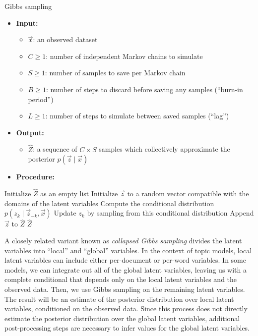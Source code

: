 \documentclass{article}
\begin{document}
\begin{algorithm}
\caption{Gibbs sampling}
\label{alg:gibbs}
\begin{itemize}[leftmargin=*]
\item \textbf{Input:}
  \begin{itemize}
  \item $\vec x$: an observed dataset
  \item $C \geq 1$: number of independent Markov chains to simulate
  \item $S \geq 1$: number of samples to save per Markov chain
  \item $B \geq 1$: number of steps to discard before saving any samples (``burn-in period'')
  \item $L \geq 1$: number of steps to simulate between saved samples (``lag'')
  \end{itemize}
\item \textbf{Output:}
  \begin{itemize}
  \item $\hat Z$: a sequence of $C \times S$ samples which collectively approximate the posterior $p(\vec z \mid \vec x)$
  \end{itemize}
\item \textbf{Procedure:}
\end{itemize}
\begin{algorithmic}
\State Initialize $\hat Z$ as an empty list
  \State Initialize $\vec z$ to a random vector compatible with the domains of the latent variables
    \State Compute the conditional distribution $p(z_k \mid \vec z_{-k}, \vec x)$
    \State Update $z_k$ by sampling from this conditional distribution
      \State Append $\vec z$ to $\hat Z$
    \EndIf
  \EndFor
\EndFor
\State \Return $\hat Z$
\end{algorithmic}
\end{algorithm}

A closely related variant known as \emph{collapsed Gibbs sampling} divides the latent variables into ``local'' and ``global'' variables.
In the context of topic models, local latent variables can include either per-document or per-word variables.
In some models, we can integrate out all of the global latent variables, leaving us with a complete conditional that depends only on the local latent variables and the observed data.
Then, we use Gibbs sampling on the remaining latent variables.
The result will be an estimate of the posterior distribution over local latent variables, conditioned on the observed data.
Since this process does not directly estimate the posterior distribution over the global latent variables, additional post-processing steps are necessary to infer values for the global latent variables.
\end{document}
